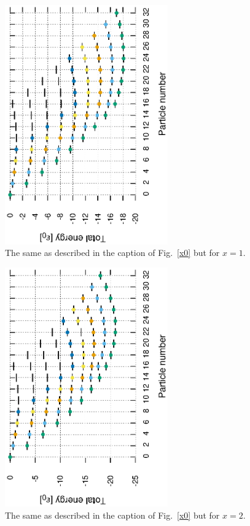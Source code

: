 \documentclass[11pt]{book} %
\begin{document}
\begin{figure}[htbp]
 \begin{center}
  \includegraphics[width=70mm,angle=-90]{images/spectra_x1.eps}
 \end{center}
 \caption{The same as described in the caption of Fig.~\ref{x0} but for $x=1$.
	}
 \label{x1}
\end{figure}

\begin{figure}[htbp]
 \begin{center}
  \includegraphics[width=70mm,angle=-90]{images/spectra_x2.eps}
 \end{center}
 \caption{The same as described in the caption of Fig.~\ref{x0} but for $x=2$.
	}
 \label{x2}
\end{figure}
\end{document}
